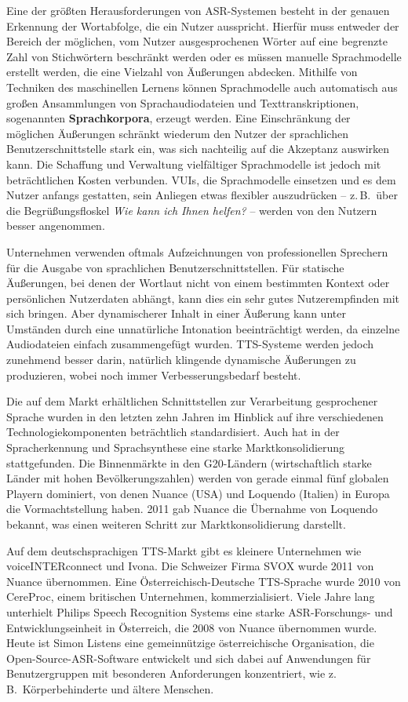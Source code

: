 \documentclass[]{../../metanetpaper}
\begin{document}
\begin{multicols}{2}
Eine der größten Herausforderungen von ASR-Syste\-men besteht in der genauen Erkennung der Wortabfolge, die ein Nutzer ausspricht. Hierfür muss entweder der Bereich der möglichen, vom Nutzer ausgesprochenen Wörter auf eine begrenzte Zahl von Stichwörtern beschränkt werden oder es müssen manuelle Sprachmodelle erstellt werden, die eine Vielzahl von Äußerungen abdecken. Mithilfe von Techniken des maschinellen Lernens können Sprachmodelle auch automatisch aus großen Ansammlungen von Sprachaudiodateien und Texttranskriptionen, sogenannten \textbf{Sprachkorpora}, erzeugt werden. Eine Einschränkung der möglichen Äußerungen schränkt wiederum den Nutzer der sprachlichen Benutzerschnittstelle stark ein, was sich nachteilig auf die Akzeptanz auswirken kann. Die Schaffung und Verwaltung vielfältiger Sprachmodelle ist jedoch mit beträchtlichen Kosten verbunden. VUIs, die Sprachmodelle einsetzen und es dem Nutzer anfangs gestatten, sein Anliegen etwas flexibler auszudrücken -- z.\,B.~über die Begrüßungsfloskel \textit{Wie kann ich Ihnen helfen?} -- werden von den Nutzern besser angenommen. 

Unternehmen verwenden oftmals Aufzeichnungen von professionellen Sprechern für die Ausgabe von sprachlichen Benutzerschnittstellen. Für statische Äußerungen, bei denen der Wortlaut nicht von einem bestimmten Kontext oder persönlichen Nutzerdaten abhängt, kann dies ein sehr gutes Nutzerempfinden mit sich bringen. Aber dynamischerer Inhalt in einer Äußerung kann unter Umständen durch eine unnatürliche Intonation beeinträchtigt werden, da einzelne Audiodateien einfach zusammengefügt wurden. TTS-Systeme werden jedoch zunehmend besser darin, natürlich klingende dynamische Äußerungen zu produzieren, wobei noch immer Verbesserungsbedarf besteht. 

Die auf dem Markt erhältlichen Schnittstellen zur Verarbeitung gesprochener Sprache wurden in den letzten zehn Jahren im Hinblick auf ihre verschiedenen Technologiekomponenten beträchtlich standardisiert. Auch hat in der Spracherkennung und Sprachsynthese eine starke Marktkonsolidierung stattgefunden. Die Binnenmärkte in den G20-Ländern (wirtschaftlich starke Länder mit hohen Bevölkerungszahlen) werden von gerade einmal fünf globalen Playern dominiert, von denen Nuance (USA) und Loquendo (Italien) in Europa die Vormachtstellung haben. 2011 gab Nuance die Übernahme von Loquendo bekannt, was einen weiteren Schritt zur Marktkonsolidierung darstellt.

Auf dem deutschsprachigen TTS-Markt gibt es kleinere Unternehmen wie voiceINTERconnect und Ivona. Die Schweizer Firma SVOX wurde 2011 von Nuance übernommen. Eine Öster\-reichisch-Deutsche TTS-Sprache wurde 2010 von CereProc, einem britischen Unternehmen, kommerzialisiert. Viele Jahre lang unterhielt Philips Speech Recognition Systems eine starke ASR-For\-schungs- und Entwicklungseinheit in Österreich, die 2008 von Nuance übernommen wurde. Heute ist Simon Listens eine gemeinnützige österreichische Organisation, die Open-Source-ASR-Soft\-ware entwickelt und sich dabei auf Anwendungen für Benutzergruppen mit besonderen Anforderungen konzentriert, wie z.\,B.~Körperbehinderte und ältere Menschen.


\end{multicols}
\end{document}

